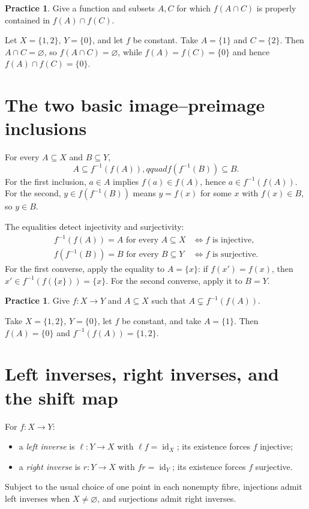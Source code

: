 \documentclass[11pt,openany]{book}
\newcommand{\id}{\operatorname{id}}\newcommand{\Sym}{\operatorname{Sym}}
\theoremstyle{definition}
\newtheorem{exercise}[theorem]{Practice}
\begin{document}
\begin{exercise}
Give a function and subsets $A,C$ for which $f(A\cap C)$ is properly contained in $f(A)\cap f(C)$.
\end{exercise}
\begin{solution}
Let $X=\{1,2\}$, $Y=\{0\}$, and let $f$ be constant. Take $A=\{1\}$ and $C=\{2\}$. Then $A\cap C=\varnothing$, so $f(A\cap C)=\varnothing$, while $f(A)=f(C)=\{0\}$ and hence $f(A)\cap f(C)=\{0\}$.
\end{solution}

\section{The two basic image--preimage inclusions}
For every $A\subseteq X$ and $B\subseteq Y$,
\[
A\subseteq f^{-1}(f(A)),qquad f(f^{-1}(B))\subseteq B. \tag{14.1}
\]
For the first inclusion, $a\in A$ implies $f(a)\in f(A)$, hence $a\in f^{-1}(f(A))$. For the second, $y\in f(f^{-1}(B))$ means $y=f(x)$ for some $x$ with $f(x)\in B$, so $y\in B$.

The equalities detect injectivity and surjectivity:
\begin{align*}
f^{-1}(f(A))=A\text{ for every }A\subseteq X
&\iff f\text{ is injective},\\
f(f^{-1}(B))=B\text{ for every }B\subseteq Y
&\iff f\text{ is surjective}.
\end{align*}
For the first converse, apply the equality to $A=\{x\}$: if $f(x')=f(x)$, then $x'\in f^{-1}(f(\{x\}))=\{x\}$. For the second converse, apply it to $B=Y$.

\begin{exercise}
Give $f:X\to Y$ and $A\subseteq X$ such that $A\subsetneq f^{-1}(f(A))$.
\end{exercise}
\begin{solution}
Take $X=\{1,2\}$, $Y=\{0\}$, let $f$ be constant, and take $A=\{1\}$. Then $f(A)=\{0\}$ and $f^{-1}(f(A))=\{1,2\}$.
\end{solution}

\section{Left inverses, right inverses, and the shift map}
For $f:X\to Y$:
\begin{itemize}
\item a \emph{left inverse} is $\ell:Y\to X$ with $\ell f=\id_X$; its existence forces $f$ injective;
\item a \emph{right inverse} is $r:Y\to X$ with $fr=\id_Y$; its existence forces $f$ surjective.
\end{itemize}
Subject to the usual choice of one point in each nonempty fibre, injections admit left inverses when $X\ne\varnothing$, and surjections admit right inverses.
\end{document}
